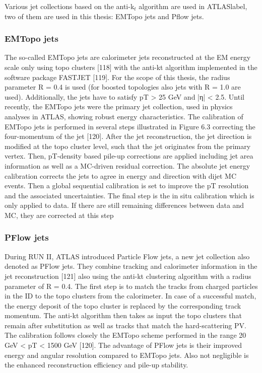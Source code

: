 Various jet collections based on the anti-k$_t$ algorithm are used in \acrshort{ATLASlabel}, two of them are used in this thesis: EMTopo jets and Pflow jets.

\subsubsection{EMTopo jets}

The so-called EMTopo jets are calorimeter jets reconstructed at the EM energy scale only using topo
clusters [118] with the anti-kt algorithm implemented in the software package FASTJET [119]. For
the scope of this thesis, the radius parameter R = 0.4 is used (for boosted topologies also jets with
R = 1.0 are used). Additionally, the jets have to satisfy pT > 25 GeV and |η| < 2.5. Until recently,
the EMTopo jets were the primary jet collection, used in physics analyses in ATLAS, showing robust
energy characteristics.
The calibration of EMTopo jets is performed in several steps illustrated in Figure 6.3 correcting the
four-momentum of the jet [120]. After the jet reconstruction, the jet direction is modified at the topo
cluster level, such that the jet originates from the primary vertex. Then, pT-density based pile-up corrections are applied including jet area information as well as a MC-driven residual correction.
The absolute jet energy calibration corrects the jets to agree in energy and direction with dijet MC
events. Then a global sequential calibration is set to improve the pT resolution and the associated
uncertainties. The final step is the in situ calibration which is only applied to data. If there are still
remaining differences between data and MC, they are corrected at this step

\subsubsection{PFlow jets}

During RUN II, ATLAS introduced Particle Flow jets, a new jet collection also denoted as PFlow
jets. They combine tracking and calorimeter information in the jet reconstruction [121] also using
the anti-kt clustering algorithm with a radius parameter of R = 0.4.
The first step is to match the tracks from charged particles in the ID to the topo clusters from the
calorimeter. In case of a successful match, the energy deposit of the topo cluster is replaced by the
corresponding track momentum. The anti-kt algorithm then takes as input the topo clusters that
remain after substitution as well as tracks that match the hard-scattering PV. The calibration follows
closely the EMTopo scheme performed in the range 20 GeV < pT < 1500 GeV [120].
The advantage of PFlow jets is their improved energy and angular resolution compared to EMTopo
jets. Also not negligible is the enhanced reconstruction efficiency and pile-up stability.

